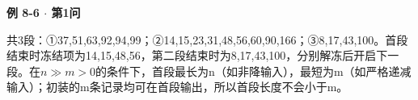 {\color{ink}\bfseries 例 8-6 \(\cdot \) 第1问}\par\vspace{1bp}共3段：{\symfont ①}37,\allowbreak{}51,\allowbreak{}63,\allowbreak{}92,\allowbreak{}94,\allowbreak{}99；{\symfont ②}14,\allowbreak{}15,\allowbreak{}23,\allowbreak{}31,\allowbreak{}48,\allowbreak{}56,\allowbreak{}60,\allowbreak{}90,\allowbreak{}166；{\symfont ③}8,\allowbreak{}17,\allowbreak{}43,\allowbreak{}100。首段结束时冻结项为14,\allowbreak{}15,\allowbreak{}48,\allowbreak{}56，第二段结束时为8,\allowbreak{}17,\allowbreak{}43,\allowbreak{}100，分别解冻后开启下一段。在\(n\gg m>\allowbreak{}0\)的条件下，首段最长为n（如非降输入），最短为m（如严格递减输入）；初装的m条记录均可在首段输出，所以首段长度不会小于m。
